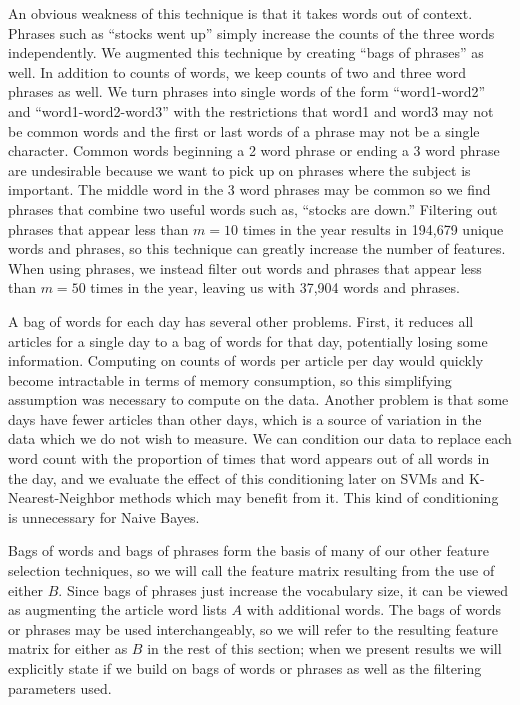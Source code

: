 \documentclass[10pt, twocolumn]{article}
\begin{document}
An obvious weakness of this technique is that it takes words out of context. Phrases such as ``stocks went up'' simply increase the counts of the three words independently. We augmented this technique by creating ``bags of phrases'' as well. In addition to counts of words, we keep counts of two and three word phrases
as well. We turn phrases into single words of the form ``word1-word2'' and ``word1-word2-word3'' with the restrictions that word1 and word3 may not be common words and the first or last words of a phrase may not be a single character. Common words beginning a 2 word phrase or ending a 3 word phrase are undesirable because we want to pick up on phrases where the subject is important. The middle word in the 3 word phrases may be common so we find phrases that combine two useful words such as, ``stocks are down.'' Filtering out phrases that appear less than $m = 10$ times in the year results in 194,679 unique words and phrases, so this technique can greatly increase the number of features. When using phrases, we instead filter out words and phrases that appear less than $m = 50$ times in the year, leaving us with 37,904 words and phrases. 

A bag of words for each day has several other problems. First, it reduces all articles for a single day to a bag of words for that day, potentially losing some information. Computing on counts of words per article per day would quickly become intractable in terms of memory consumption, so this simplifying assumption was necessary to compute on the data. Another problem is that some days have fewer articles than other days, which is a source of variation in the data which we do not wish to measure. We can condition our data to replace each word count with the proportion of times that word appears out of all words in the day, and we evaluate the effect of this conditioning later on SVMs and K-Nearest-Neighbor methods which may benefit from it. This kind of conditioning is unnecessary for Naive Bayes.

Bags of words and bags of phrases form the basis of many of our other feature selection techniques, so we will call the feature matrix resulting from the use of either $B$. Since bags of phrases just increase the vocabulary size, it can be viewed as augmenting the article word lists $A$ with additional words. The bags of words or phrases may be used interchangeably, so we will refer to the resulting feature matrix for either as $B$ in the rest of this section; when we present results we will explicitly state if we build on bags of words or phrases as well as the filtering parameters used.
\end{document}
